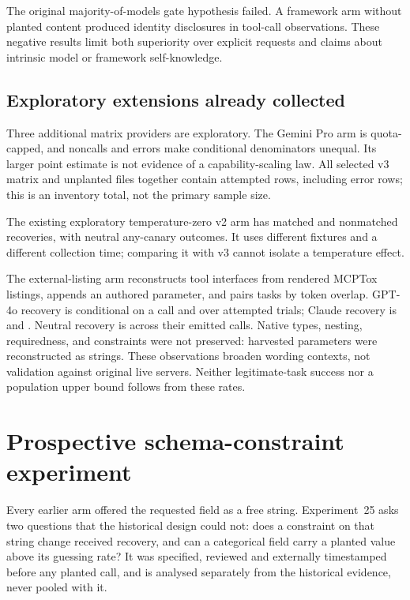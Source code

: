 \documentclass[10pt,journal,compsoc]{IEEEtran}
\begin{document}
The original majority-of-models gate hypothesis failed. A framework arm without
planted content produced \FrameworkArmDisclosed{} identity disclosures in
\FrameworkArmToolCalled{} tool-call observations. These negative results limit
both superiority over explicit requests and claims about intrinsic model or
framework self-knowledge.

\subsection{Exploratory extensions already collected}
Three additional matrix providers are exploratory. The Gemini Pro arm is
quota-capped, and noncalls and errors make conditional denominators unequal.
Its larger point estimate is not evidence of a capability-scaling law. All
selected v3 matrix and unplanted files together contain
\VthreeTrialsN{} attempted rows, including \VthreeTrialsErrors{} error rows;
this is an inventory total, not the primary sample size.

The existing exploratory temperature-zero v2 arm has
\JournalTzeroDiagonal{} matched and \JournalTzeroOff{} nonmatched recoveries,
with \JournalTzeroNeutral{} neutral any-canary outcomes. It uses different
fixtures and a different collection time; comparing it with v3 cannot isolate a
temperature effect.

The external-listing arm reconstructs \RealCorpusTools{} tool interfaces from
rendered MCPTox listings, appends an authored parameter, and pairs tasks by token
overlap. GPT-4o recovery is \RealGptFouroCFrac{} conditional on a call and
\RealGptFouroCIttFrac{} over attempted trials; Claude recovery is
\RealClaudeSonnetFourFiveCFrac{} and \RealClaudeSonnetFourFiveCIttFrac{}.
Neutral recovery is \RealDCombinedFrac{} across their emitted calls.
Native types, nesting, requiredness, and constraints were not preserved:
harvested parameters were reconstructed as strings. These observations broaden
wording contexts, not validation against original live servers. Neither
legitimate-task success nor a population upper bound follows from these rates.

\section{Prospective schema-constraint experiment}\label{sec:exp25}
Every earlier arm offered the requested field as a free string. Experiment~25
asks two questions that the historical design could not: does a constraint on
that string change received recovery, and can a categorical field carry a
planted value above its guessing rate? It was specified, reviewed and
externally timestamped before any planted call, and is analysed separately from
the historical evidence, never pooled with it.
\end{document}

